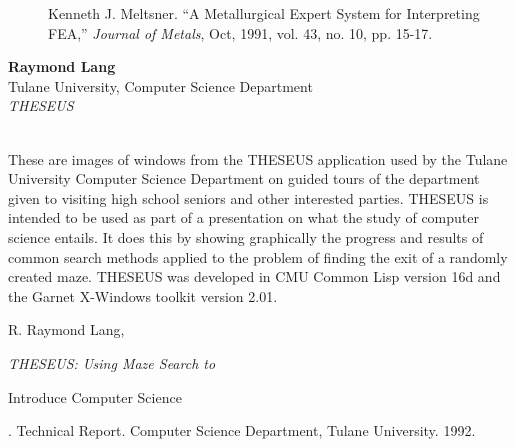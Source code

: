 \begin{description}
\item[] Kenneth J. Meltsner.
``A Metallurgical Expert System for Interpreting FEA,'' {\it Journal of Metals},
Oct, 1991, vol. 43, no. 10, pp. 15-17.
\end{description}

\newpage{}

\begin{center}
\end{center}
\begin{center}
\end{center}
\begin{center}
\end{center}
\begin{tabular}
{\bf Raymond Lang}\\
Tulane University, Computer Science Department\\
{\it THESEUS}\\
\\
\end{tabular}

These are images of windows from the
THESEUS application used by the Tulane University Computer Science
Department on guided tours of the department given to visiting high
school seniors and other interested parties.  THESEUS is intended to
be used as part of a presentation on what the study of computer
science entails.  It does this by showing graphically the progress and
results of common search methods applied to the problem of finding the
exit of a randomly created maze.  THESEUS was developed in CMU Common
Lisp version 16d and the Garnet X-Windows toolkit version 2.01.

\begin{description}
R. Raymond Lang, {\it THESEUS: Using Maze Search to
\item[] Introduce Computer Science}.  Technical Report.  Computer Science
Department, Tulane University. 1992.
\end{description}

\newpage{}

